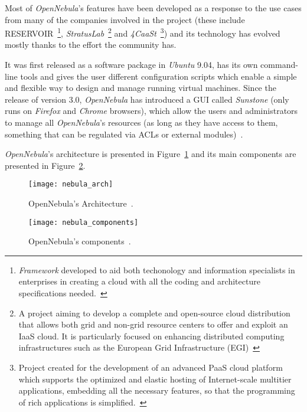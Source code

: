 Most of \textit{OpenNebula}'s features have been developed as a response to the use cases from many of the companies involved in the project (these include RESERVOIR~\footnote{\textit{Framework} developed to aid both techonology and information specialists in enterprises in creating a cloud with all the coding and architecture specifications needed.~\cite{http://www.reservoir-fp7.eu/}}, \textit{StratusLab}~\footnote{A project aiming to develop a complete and open-source cloud distribution that allows both grid and non-grid resource centers to offer and exploit an IaaS cloud. It is particularly focused on enhancing distributed computing infrastructures such as the European Grid Infrastructure (EGI)~\cite{startuslab.eu}} and \textit{4CaaSt}~\footnote{Project created for the development of an advanced PaaS cloud platform which supports the optimized and elastic hosting of Internet-scale multitier applications, embedding all the necessary features, so that the programming of rich applications is simplified.~\cite{http://4caast.morfeo-project.org/}}) and its technology has evolved mostly thanks to the effort the community has.~\cite{opennebula_site}

It was first released as a software package in \textit{Ubuntu} 9.04, has its own command-line tools and gives the user different configuration scripts which enable a simple and flexible way to design and manage running virtual machines. Since the release of version 3.0, \textit{OpenNebula} has introduced a GUI called \textit{Sunstone} (only runs on \textit{Firefox} and \textit{Chrome} browsers), which allow the users and administrators to manage all \textit{OpenNebula}'s resources (as long as they have access to them, something that can be regulated via ACLs or external modules)~\cite{jorge-ruao}.

\textit{OpenNebula}'s architecture is presented in Figure~\ref{fig:nebula_arch} and its main components are presented in Figure~\ref{fig:nebula_components}.

\begin{figure}[h!]
  \begin{center}
    \leavevmode
    \texttt{[image: nebula\_arch]}
    \caption{OpenNebula's Architecture~\cite{http://opennebula.org/about:technology}.}
    \label{fig:nebula_arch}
  \end{center}
\end{figure}

\begin{figure}[h!]
  \begin{center}
    \leavevmode
    \texttt{[image: nebula\_components]}
    \caption{OpenNebula's components~\cite{http://www.opennebula.org/documentation:rel3.4}.}
    \label{fig:nebula_components}
  \end{center} 
\end{figure}


